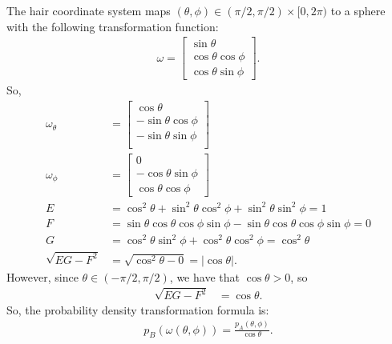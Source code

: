 \documentclass[10pt]{article}
\begin{document}
  The hair coordinate system maps $(\theta,\phi) \in (\pi/2, \pi/2) \times [0,2\pi)$ to a sphere with the following transformation function:
  \begin{align*}
    \omega = \begin{bmatrix}
      \sin\theta \\
      \cos\theta \cos\phi \\
      \cos\theta \sin\phi
    \end{bmatrix}.
  \end{align*}
  So,
  \begin{align*}
    \omega_\theta &= \begin{bmatrix}
      \cos \theta \\
      -\sin\theta \cos\phi \\
      -\sin\theta \sin\phi \\
    \end{bmatrix} \\
    \omega_\phi &= \begin{bmatrix}
      0 \\
      - \cos\theta \sin\phi \\
      \cos\theta \cos\phi
    \end{bmatrix}\\
    E &= \cos^2\theta + \sin^2 \theta \cos^2 \phi + \sin^2\theta \sin^2\phi = 1 \\
    F &= \sin\theta\cos\theta \cos\phi\sin\phi - \sin\theta \cos\theta \cos\phi\sin\phi = 0 \\
    G &= \cos^2\theta \sin^2\phi + \cos^2 \theta \cos^2\phi = \cos^2\theta\\
    \sqrt{EG-F^2} &= \sqrt{\cos^2 \theta - 0} = | \cos\theta |.
  \end{align*}
  However, since $\theta \in (-\pi/2, \pi/2)$, we have that $\cos\theta > 0$, so
  \begin{align*}
    \sqrt{EG-F^2} &= \cos\theta.
  \end{align*}
  So, the probability density transformation formula is:
  \begin{align*}
    p_B(\omega(\theta, \phi)) = \frac{p_A(\theta,\phi)}{\cos \theta}.
  \end{align*}
\end{document}
